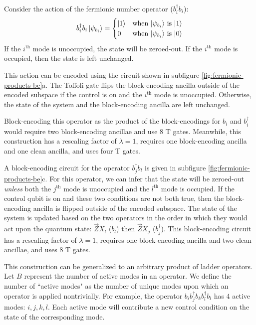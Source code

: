 Consider the action of the fermionic number operator ($b_i^\dagger b_i$):
\begin{equation}
    \begin{split}
        b_i^\dagger b_i \ket{\psi_{b_i}} = \begin{cases} 
            \ket{1} & \text{when $\ket{\psi_{b_i}}$ is $\ket{1}$} \\
            0 & \text{when $\ket{\psi_{b_i}}$ is $\ket{0}$} \\
                                        \end{cases}
    \end{split}
\end{equation}
If the $i^\text{th}$ mode is unoccupied, the state will be zeroed-out.
If the $i^\text{th}$ mode is occupied, then the state is left unchanged.

This action can be encoded using the circuit shown in subfigure \ref{fig:fermionic-products-be}a.
The Toffoli gate flips the block-encoding ancilla outside of the encoded subspace if the control is on and the $i^\text{th}$ mode is unoccupied.
Otherwise, the state of the system and the block-encoding ancilla are left unchanged.

Block-encoding this operator as the product of the block-encodings for $b_i$ and $b_i^\dagger$ would require two block-encoding ancillae and use $8$ T gates.
Meanwhile, this construction has a rescaling factor of $\lambda = 1$, requires one block-encoding ancilla and one clean ancilla, and uses four T gates.

A block-encoding circuit for the operator $b_j^\dagger b_l$ is given in subfigure \ref{fig:fermionic-products-be}c.
For this operator, we can infer that the state will be zeroed-out \textit{unless} both the $j^\text{th}$ mode is unoccupied and the $l^\text{th}$ mode is occupied.
If the control qubit is on and these two conditions are not both true, then the block-encoding ancilla is flipped outside of the encoded subspace.
The state of the system is updated based on the two operators in the order in which they would act upon the quantum state: $\vec{Z}X_l$ ($b_l$) then $\vec{Z}X_j$ ($b_j^\dagger$).
This block-encoding circuit has a rescaling factor of $\lambda = 1$, requires one block-encoding ancilla and two clean ancillae, and uses $8$ T gates.


This construction can be generalized to an arbitrary product of ladder operators.
Let $B$ represent the number of active modes in an operator.
We define the number of ``active modes" as the number of unique modes upon which an operator is applied nontrivially.
For example, the operator $b_i b_j^\dagger b_k b_l^\dagger b_l$ has $4$ active modes: $i, j, k, l$.
Each active mode will contribute a new control condition on the state of the corresponding mode.

